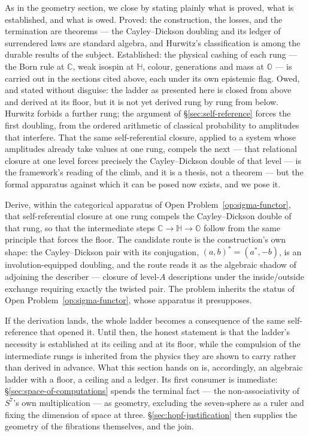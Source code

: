 As in the geometry section, we close by stating plainly what is proved, what is established, and what is
owed. Proved: the construction, the losses, and the termination are theorems --- the Cayley--Dickson
doubling and its ledger of surrendered laws are standard algebra, and Hurwitz's classification is
among the durable results of the subject. Established: the physical cashing of each rung --- the
Born rule at $\mathbb{C}$, weak isospin at $\mathbb{H}$, colour, generations and mass at
$\mathbb{O}$ --- is carried out in the sections cited above, each under its own epistemic flag. Owed,
and stated without disguise: the ladder as presented here is closed from above and derived at its
floor, but it is not yet derived rung by rung from below. Hurwitz forbids a further rung; the
argument of \S\ref{sec:self-reference} forces the first doubling, from the ordered arithmetic of
classical probability to amplitudes that interfere. That the same self-referential closure, applied
to a system whose amplitudes already take values at one rung, compels the next --- that relational
closure at one level forces precisely the Cayley--Dickson double of that level --- is the
framework's reading of the climb, and it is a thesis, not a theorem --- but the formal apparatus
against which it can be posed now exists, and we pose it.

\begin{openproblem}\label{op:ladder-compulsion}
Derive, within the categorical apparatus of Open Problem~\ref{op:sigma-functor}, that
self-referential closure at one rung compels the Cayley--Dickson double of that rung, so that the
intermediate steps $\mathbb{C} \to \mathbb{H} \to \mathbb{O}$ follow from the same principle
that forces the floor. The candidate route is the construction's own shape: the Cayley--Dickson
pair with its conjugation, $(a, b)^{*} = (a^{*}, -b)$, is an involution-equipped doubling, and the
route reads it as the algebraic shadow of adjoining the describer --- closure of level-$A$
descriptions under the inside/outside exchange requiring exactly the twisted pair. The problem
inherits the status of Open Problem~\ref{op:sigma-functor}, whose apparatus it presupposes.
\end{openproblem}

If the derivation lands, the whole ladder becomes a consequence of the same self-reference that
opened it. Until then, the honest statement is that the ladder's necessity is established at its
ceiling and at its floor, while the compulsion of the intermediate rungs is inherited from the
physics they are shown to carry rather than derived in advance. What this section hands on is, accordingly, an algebraic ladder with a floor, a ceiling and a
ledger. Its first consumer is immediate: \S\ref{sec:space-of-computations} spends the terminal
fact --- the non-associativity of $S^{7}$'s own multiplication --- as geometry, excluding the
seven-sphere as a ruler and fixing the dimension of space at three.
\S\ref{sec:hopf-justification} then supplies the geometry of the fibrations themselves, and the
join.
